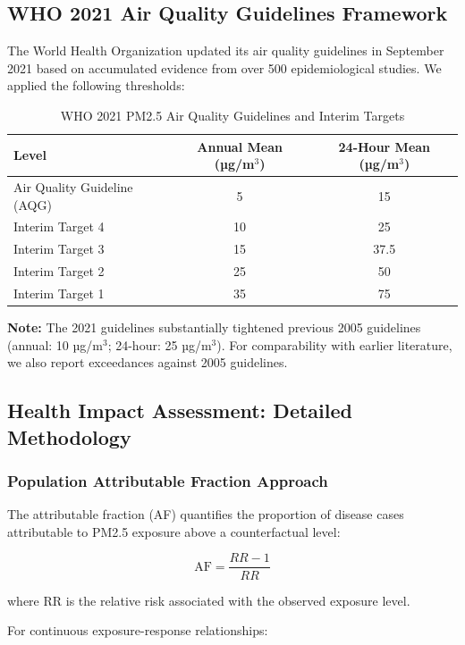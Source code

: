 \documentclass[11pt,a4paper]{article}
\begin{document}
\subsection{WHO 2021 Air Quality Guidelines Framework}

The World Health Organization updated its air quality guidelines in September 2021 based on accumulated evidence from over 500 epidemiological studies. We applied the following thresholds:

\begin{table}[H]
\centering
\caption{WHO 2021 PM2.5 Air Quality Guidelines and Interim Targets}
\begin{tabular}{lcc}
\toprule
Level & Annual Mean (µg/m$^3$) & 24-Hour Mean (µg/m$^3$) \\
\midrule
Air Quality Guideline (AQG) & 5 & 15 \\
Interim Target 4 & 10 & 25 \\
Interim Target 3 & 15 & 37.5 \\
Interim Target 2 & 25 & 50 \\
Interim Target 1 & 35 & 75 \\
\bottomrule
\end{tabular}
\end{table}

\textbf{Note:} The 2021 guidelines substantially tightened previous 2005 guidelines (annual: 10 µg/m$^3$; 24-hour: 25 µg/m$^3$). For comparability with earlier literature, we also report exceedances against 2005 guidelines.

\subsection{Health Impact Assessment: Detailed Methodology}

\subsubsection{Population Attributable Fraction Approach}

The attributable fraction (AF) quantifies the proportion of disease cases attributable to PM2.5 exposure above a counterfactual level:

\begin{equation}
    \text{AF} = \frac{RR - 1}{RR}
\end{equation}

where RR is the relative risk associated with the observed exposure level.

For continuous exposure-response relationships:
\end{document}
